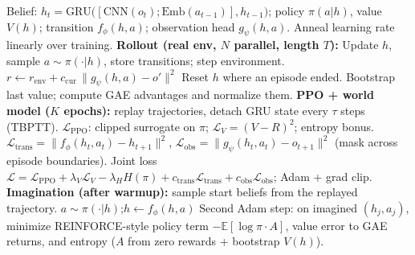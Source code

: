 \documentclass[11pt]{article}
\begin{document}
\begin{algorithm}[t]
\caption{World Model Agent --- one training update}
\label{alg:world_model_train}
\begin{algorithmic}[1]
\State Belief: $h_t = \mathrm{GRU}\bigl([\mathrm{CNN}(o_t); \mathrm{Emb}(a_{t-1})], h_{t-1}\bigr)$;
  policy $\pi(a|h)$, value $V(h)$; transition $f_\phi(h,a)$; observation head $g_\psi(h,a)$.
\State Anneal learning rate linearly over training.
\State \textbf{Rollout (real env, $N$ parallel, length $T$):}
  \State Update $h$, sample $a \sim \pi(\cdot|h)$, store transitions; step environment.
    \State $r \gets r_{\mathrm{env}} + c_{\mathrm{cur}}\,\lVert g_\psi(h,a) - o'\rVert^2$
  \EndIf
  \State Reset $h$ where an episode ended.
\EndFor
\State Bootstrap last value; compute GAE advantages and normalize them.
\State \textbf{PPO + world model ($K$ epochs):} replay trajectories, detach GRU state every $\tau$ steps (TBPTT).
\State $\mathcal{L}_{\mathrm{PPO}}$: clipped surrogate on $\pi$; $\mathcal{L}_V = (V - R)^2$; entropy bonus.
\State $\mathcal{L}_{\mathrm{trans}} = \|f_\phi(h_t,a_t) - h_{t+1}\|^2$,
  $\mathcal{L}_{\mathrm{obs}} = \|g_\psi(h_t,a_t) - o_{t+1}\|^2$ (mask across episode boundaries).
\State Joint loss $\mathcal{L} = \mathcal{L}_{\mathrm{PPO}} + \lambda_V \mathcal{L}_V - \lambda_H H(\pi)
  + c_{\mathrm{trans}}\mathcal{L}_{\mathrm{trans}} + c_{\mathrm{obs}}\mathcal{L}_{\mathrm{obs}}$; Adam + grad clip.
\State \textbf{Imagination (after warmup):} sample start beliefs from the replayed trajectory.
  \State $a \sim \pi(\cdot|h)$;\quad $h \gets f_\phi(h,a)$ 
\EndFor
\State Second Adam step: on imagined $(h_j,a_j)$, minimize REINFORCE-style policy term $-\mathbb{E}[\log\pi \cdot A]$,
  value error to GAE returns, and entropy ($A$ from zero rewards + bootstrap $V(h)$).
\end{algorithmic}
\end{algorithm}
\end{document}
